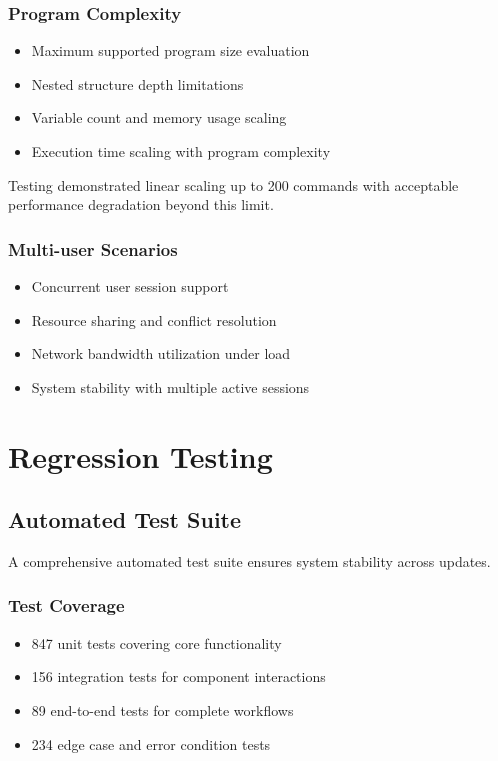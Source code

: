 \subsubsection{Program Complexity}
\begin{itemize}
    \item Maximum supported program size evaluation
    \item Nested structure depth limitations
    \item Variable count and memory usage scaling
    \item Execution time scaling with program complexity
\end{itemize}

Testing demonstrated linear scaling up to 200 commands with acceptable performance degradation beyond this limit.

\subsubsection{Multi-user Scenarios}
\begin{itemize}
    \item Concurrent user session support
    \item Resource sharing and conflict resolution
    \item Network bandwidth utilization under load
    \item System stability with multiple active sessions
\end{itemize}

\section{Regression Testing}

\subsection{Automated Test Suite}

A comprehensive automated test suite ensures system stability across updates.

\subsubsection{Test Coverage}
\begin{itemize}
    \item 847 unit tests covering core functionality
    \item 156 integration tests for component interactions
    \item 89 end-to-end tests for complete workflows
    \item 234 edge case and error condition tests
\end{itemize}

